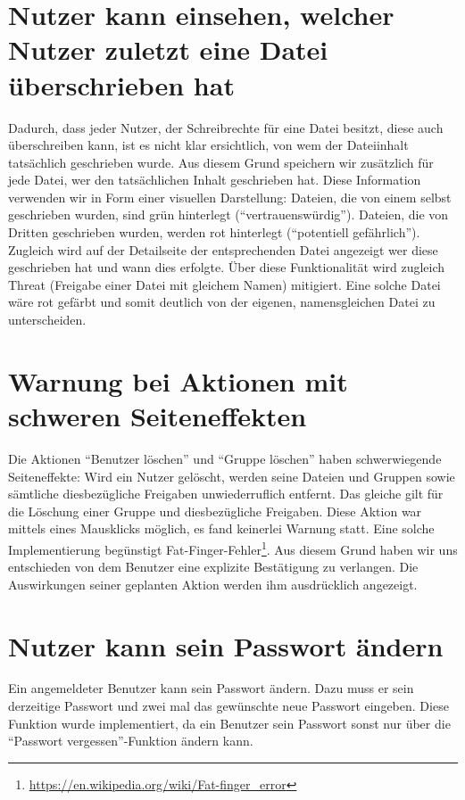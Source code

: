 \documentclass[12pt,DIV14,BCOR10mm,a4paper,parskip=half-,headsepline,headinclude,english,ngerman,bibliography=totocnumbered]{scrreprt}
\begin{document}
\section{Nutzer kann einsehen, welcher Nutzer zuletzt eine Datei überschrieben hat}
Dadurch, dass jeder Nutzer, der Schreibrechte für eine Datei besitzt, diese auch übersch\-rei\-ben kann, ist es nicht klar ersichtlich, von wem der Dateiinhalt tatsächlich geschrieben wurde. Aus diesem Grund speichern wir zusätzlich für jede Datei, wer den tatsächlichen Inhalt geschrieben hat. Diese Information verwenden wir in Form einer visuellen Darstellung: Dateien, die von einem selbst geschrieben wurden, sind grün hinterlegt (\enquote{vertrauenswürdig}). Dateien, die von Dritten geschrieben wurden, werden rot hinterlegt (\enquote{potentiell gefährlich}). Zugleich wird auf der Detailseite der entsprechenden Datei angezeigt wer diese geschrieben hat und wann dies erfolgte.
Über diese Funktionalität wird zugleich Threat (Freigabe einer Datei mit gleichem Namen) mitigiert. Eine solche Datei wäre rot gefärbt und somit deutlich von der eigenen, namensgleichen Datei zu unterscheiden.

\section{Warnung bei Aktionen mit schweren Seiteneffekten}
\label{warning:severe:sideeffects}
Die Aktionen \enquote{Benutzer löschen} und \enquote{Gruppe löschen} haben schwerwiegende Seiteneffekte: Wird ein Nutzer gelöscht, werden seine Dateien und Gruppen sowie sämtliche diesbezügliche Freigaben unwiederruflich entfernt.
Das gleiche gilt für die Löschung einer Gruppe und diesbezügliche Freigaben.
Diese Aktion war mittels eines Mausklicks möglich, es fand keinerlei Warnung statt.
Eine solche Implementierung begünstigt Fat-Finger-Fehler\footnote{\url{https://en.wikipedia.org/wiki/Fat-finger_error}}.
Aus diesem Grund haben wir uns entschieden von dem Benutzer eine explizite Bestätigung zu verlangen. Die Auswirkungen seiner geplanten Aktion werden ihm ausdrücklich angezeigt.

\section{Nutzer kann sein Passwort ändern}
Ein angemeldeter Benutzer kann sein Passwort ändern. Dazu muss er sein derzeitige Passwort und zwei mal das gewünschte neue Passwort eingeben.
Diese Funktion wurde implementiert, da ein Benutzer sein Passwort sonst nur über die \enquote{Passwort vergessen}-Funktion ändern kann.
\end{document}
